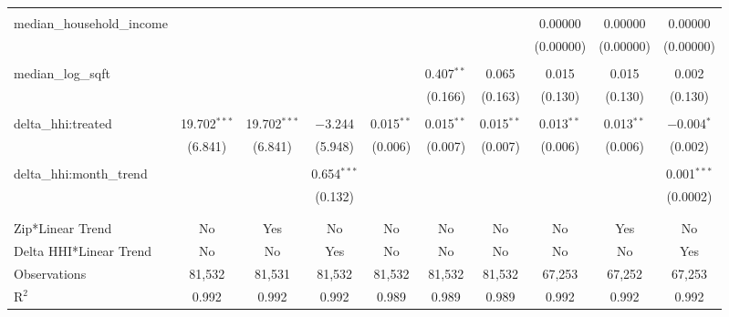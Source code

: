 \begin{table}[H]
{\begin{tabular}{@{\extracolsep{5pt}}lccccccccc}
   & & & & & & & & & \\  

  median\_household\_income &  &  &  &  &  &  & 0.00000 & 0.00000 & 0.00000 \\  

   &  &  &  &  &  &  & (0.00000) & (0.00000) & (0.00000) \\  

   & & & & & & & & & \\  

  median\_log\_sqft &  &  &  &  & 0.407$^{**}$ & 0.065 & 0.015 & 0.015 & 0.002 \\  

   &  &  &  &  & (0.166) & (0.163) & (0.130) & (0.130) & (0.130) \\  

   & & & & & & & & & \\  

  delta\_hhi:treated & 19.702$^{***}$ & 19.702$^{***}$ & $-$3.244 & 0.015$^{**}$ & 0.015$^{**}$ & 0.015$^{**}$ & 0.013$^{**}$ & 0.013$^{**}$ & $-$0.004$^{*}$ \\  

   & (6.841) & (6.841) & (5.948) & (0.006) & (0.007) & (0.007) & (0.006) & (0.006) & (0.002) \\  

   & & & & & & & & & \\  

  delta\_hhi:month\_trend &  &  & 0.654$^{***}$ &  &  &  &  &  & 0.001$^{***}$ \\  

   &  &  & (0.132) &  &  &  &  &  & (0.0002) \\  

   & & & & & & & & & \\  

 \hline \\[-1.8ex]  

 Zip*Linear Trend & No & Yes & No & No & No & No & No & Yes & No \\  

 Delta HHI*Linear Trend & No & No & Yes & No & No & No & No & No & Yes \\  

 Observations & 81,532 & 81,531 & 81,532 & 81,532 & 81,532 & 81,532 & 67,253 & 67,252 & 67,253 \\  

 R$^{2}$ & 0.992 & 0.992 & 0.992 & 0.989 & 0.989 & 0.989 & 0.992 & 0.992 & 0.992 \\  


\end{tabular}}
\end{table}
